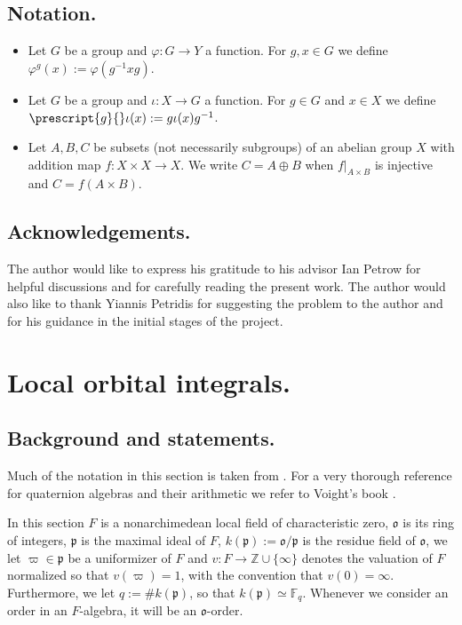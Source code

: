 \documentclass{article}
\theoremstyle{named}
\newcommand{\Z}{\mathbb{Z}}
\renewcommand{\o}{\mathfrak{o}}
\newcommand{\p}{\mathfrak{p}}
\begin{document}
\subsection{Notation.}
\begin{itemize}
    \item Let $G$ be a group and $\varphi: G \rightarrow Y$ a function. For $g, x \in G$ we define $\varphi^g(x) := \varphi(g^{-1}xg)$.  
    \item Let $G$ be a group and $\iota: X \rightarrow G$ a function. For $g \in G$ and $x \in X$ we define $\prescript{g}{}\iota(x):= g\iota(x)g^{-1}$. 
    \item Let $A, B, C$ be subsets (not necessarily subgroups) of an abelian group $X$ with addition map $f: X \times X \rightarrow X$. We write $C = A \oplus B$ when $f|_{A \times B}$ is injective and $C = f(A \times B)$.
\end{itemize}

\subsection{Acknowledgements.}
The author would like to express his gratitude to his advisor Ian Petrow for helpful discussions and for carefully reading the present work. The author would also like to thank Yiannis Petridis for suggesting the problem to the author and for his guidance in the initial stages of the project.

\section{Local orbital integrals.}\label{sec:localarguments}
\subsection{Background and statements.}
Much of the notation in this section is taken from \cite{tang2025}. For a very thorough reference for quaternion algebras and their arithmetic we refer to Voight's book \cite{voight}.


In this section $F$ is a nonarchimedean local field of characteristic zero, $\o$ is its ring of integers, $\p$ is the maximal ideal of $F$, $k(\p) := \o/\p$ is the residue field of $\o$, we let $\varpi \in \p$ be a uniformizer of $F$ and $v: F \rightarrow \Z \cup \{\infty\}$ denotes the valuation of $F$ normalized so that $v(\varpi) = 1$, with the convention that $v(0) = \infty$. Furthermore, we let $q := \# k(\p)$, so that $k(\p) \simeq \mathbb{F}_q$. Whenever we consider an order in an $F$-algebra, it will be an $\o$-order.
\end{document}

